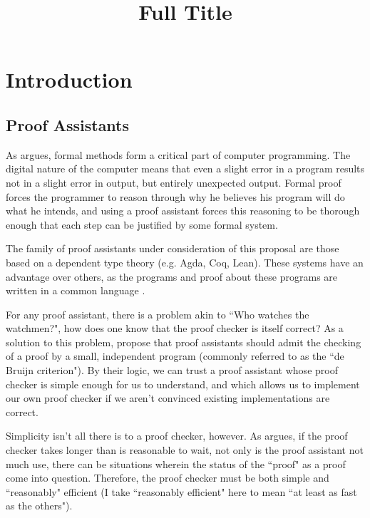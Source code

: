 \documentclass{article}
\title{Full Title}
\date{ }
\begin{document}
\maketitle

\section{Introduction}

\subsection{Proof Assistants}

As \citet{Dijkstra1988} argues, formal methods form a critical part of computer programming.
The digital nature of the computer means that even a slight error in a program results not in a slight error in output, but entirely unexpected output.
Formal proof forces the programmer to reason through why he believes his program will do what he intends, and using a proof assistant forces this reasoning to be thorough enough that each step can be justified by some formal system.

The family of proof assistants under consideration of this proposal are those based on a dependent type theory (e.g. Agda, Coq, Lean).
These systems have an advantage over others, as the programs and proof about these programs are written in a common language \citep{Nordstrom1990}.

For any proof assistant, there is a problem akin to ``Who watches the watchmen?", how does one know that the proof checker is itself correct?
As a solution to this problem, \citet{Barendregt2005} propose that proof assistants should admit the checking of a proof by a small, independent program (commonly referred to as the ``de Bruijn criterion").
By their logic, we can trust a proof assistant whose proof checker is simple enough for us to understand, and which allows us to implement our own proof checker if we aren't convinced existing implementations are correct.

Simplicity isn't all there is to a proof checker, however.
As \citet{Geuvers2008} argues, if the proof checker takes longer than is reasonable to wait, not only is the proof assistant not much use, there can be situations wherein the status of the ``proof" as a proof come into question.
Therefore, the proof checker must be both simple and ``reasonably" efficient (I take ``reasonably efficient" here to mean ``at least as fast as the others").
\end{document}
